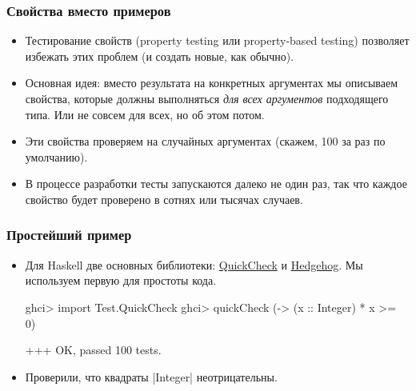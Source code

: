 \documentclass[11pt]{beamer}
\begin{document}
\begin{frame}[fragile]
  \frametitle{Свойства вместо примеров}
  \begin{itemize}
    \item Тестирование свойств (property testing или property-based testing) позволяет избежать этих проблем (и создать новые, как обычно).
    \item Основная идея: вместо результата на конкретных аргументах мы описываем свойства, которые должны выполняться \emph{для всех аргументов} подходящего типа. \pause Или не совсем для всех, но об этом потом.
          \pause
    \item Эти свойства проверяем на случайных аргументах (скажем, 100 за раз по умолчанию).
          \pause
    \item В процессе разработки тесты запускаются далеко не один раз, так что каждое свойство будет проверено в сотнях или тысячах случаев.
  \end{itemize}
\end{frame}


\begin{frame}[fragile]
  \frametitle{Простейший пример}
  \begin{itemize}
    \item Для Haskell две основных библиотеки: \href{http://hackage.haskell.org/package/QuickCheck}{QuickCheck} и \href{https://github.com/hedgehogqa/haskell-hedgehog/}{Hedgehog}. Мы используем первую для простоты кода.
          \begin{haskell}
            ghci> import Test.QuickCheck
            ghci> quickCheck (\x -> (x :: Integer) * x >= 0)
          \end{haskell}
          \begin{ghci}
            +++ OK, passed 100 tests.
          \end{ghci}
    \item Проверили, что квадраты \haskinline|Integer| неотрицательны.
  \end{itemize}
\end{frame}
\end{document}
